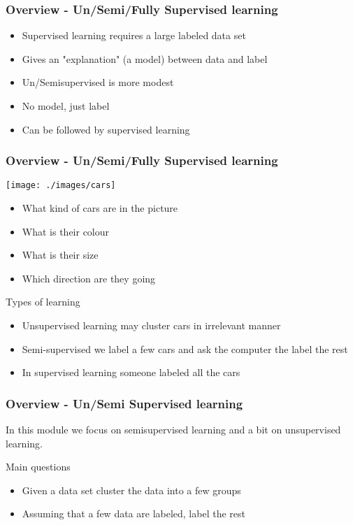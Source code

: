 \documentclass[12pt,fleqn]{beamer}
\begin{document}
\begin{frame}
\frametitle{Overview - Un/Semi/Fully Supervised learning}


\begin{itemize}
\item Supervised learning requires a large labeled data set
\item Gives an "explanation" (a model) between data and label
\item Un/Semisupervised is more modest
\item No model, just label
\item Can be followed by supervised learning
\end{itemize}


\end{frame}


\begin{frame}
\frametitle{Overview - Un/Semi/Fully Supervised learning}

\begin{center}
\texttt{[image: ./images/cars]}
\end{center}

\begin{itemize}
\item What kind of cars are in the picture
\item What is their colour
\item What is their size
\item Which direction are they going
\end{itemize}

\bigskip
Types of learning
\begin{itemize}
\item
Unsupervised learning may cluster cars in irrelevant manner
\item
Semi-supervised we label a few cars and ask the computer the label the rest
\item
In supervised learning someone labeled all the cars 
\end{itemize}


\end{frame}


\begin{frame}
\frametitle{Overview - Un/Semi Supervised learning}

In this module we focus on semisupervised learning and a bit on unsupervised learning.

Main questions
\begin{itemize}
\item Given a data set cluster the data into a few groups
\item Assuming that a few data are labeled, label the rest
\end{itemize}


\end{frame}
\end{document}
